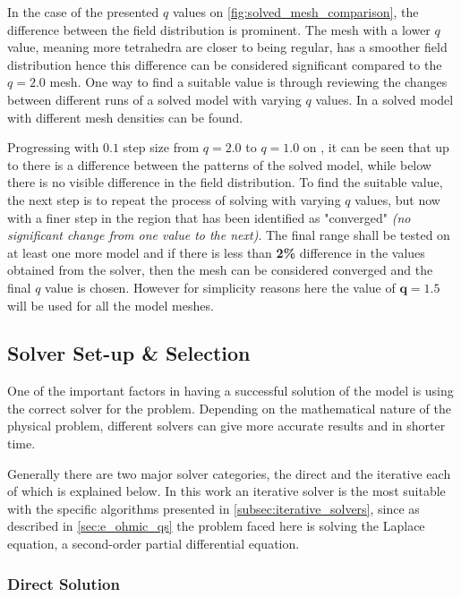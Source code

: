 In the case of the presented $q$ values on \autoref{fig:solved_mesh_comparison}, the difference between the field distribution is prominent. The mesh with a lower $q$ value, meaning more tetrahedra are closer to being regular, has a smoother field distribution hence this difference can be considered significant compared to the $q=2.0$ mesh. One way to find a suitable value is through reviewing the changes between different runs of a solved model with varying $q$ values. In  a solved model with different mesh densities can be found.


Progressing with $0.1$ step size from $q=2.0$ to $q=1.0$ on , it can be seen that up to  there is a difference between the patterns of the solved model, while below  there is no visible difference in the field distribution. To find the suitable value, the next step is to repeat the process of solving with varying $q$ values, but now with a finer step in the region that has been identified as "converged" \textit{(no significant change from one value to the next)}. The final range shall be tested on at least one more model and if there is less than \textbf{2\%} difference in the values obtained from the solver, then the mesh can be considered converged and the final $q$ value is chosen. However for simplicity reasons here the value of $\boldsymbol{q=1.5}$ will be used for all the model meshes.

\subsection{Solver Set-up \& Selection}

One of the important factors in having a successful solution of the model is using the correct solver for the problem. Depending on the mathematical nature of the physical problem, different solvers can give more accurate results and in shorter time.

Generally there are two major solver categories, the direct and the iterative each of which is explained below. In this work an iterative solver is the most suitable with the specific algorithms presented in \ref{subsec:iterative_solvers}, since as described in \ref{sec:e_ohmic_qs} the problem faced here is solving the Laplace equation, a second-order partial differential equation.

\subsubsection{Direct Solution}

